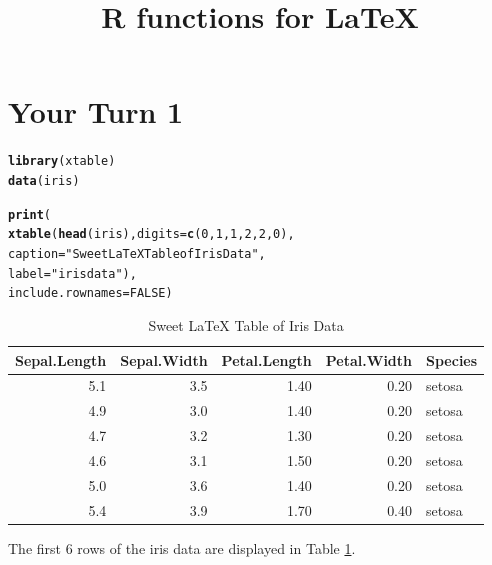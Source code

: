 \documentclass{article}\usepackage[]{graphicx}\usepackage[]{color}
\title{R functions for LaTeX}
\date{}
\makeatletter
\newcommand{\hlnum}[1]{\textcolor[rgb]{0.686,0.059,0.569}{#1}}%
\newcommand{\hlstr}[1]{\textcolor[rgb]{0.192,0.494,0.8}{#1}}%
\newcommand{\hlstd}[1]{\textcolor[rgb]{0.345,0.345,0.345}{#1}}%
\newcommand{\hlkwc}[1]{\textcolor[rgb]{0.333,0.667,0.333}{#1}}%
\newcommand{\hlkwd}[1]{\textcolor[rgb]{0.737,0.353,0.396}{\textbf{#1}}}%
\newenvironment{kframe}{%
 \def\at@end@of@kframe{}%
 \ifinner\ifhmode%
  \def\at@end@of@kframe{\end{minipage}}%
  \begin{minipage}{\columnwidth}%
 \fi\fi%
 \def\FrameCommand##1{\hskip\@totalleftmargin \hskip-\fboxsep
 \colorbox{shadecolor}{##1}\hskip-\fboxsep
     \hskip-\linewidth \hskip-\@totalleftmargin \hskip\columnwidth}%
 \MakeFramed {\advance\hsize-\width
   \@totalleftmargin\z@ \linewidth\hsize
   \@setminipage}}%
 {\par\unskip\endMakeFramed%
 \at@end@of@kframe}
\makeatother
\begin{document}
\maketitle

\section{Your Turn 1}
\begin{kframe}
\begin{alltt}
\hlkwd{library}\hlstd{(xtable)}
\hlkwd{data}\hlstd{(iris)}

\hlkwd{print}\hlstd{(}
  \hlkwd{xtable}\hlstd{(}\hlkwd{head}\hlstd{(iris),} \hlkwc{digits}\hlstd{=}\hlkwd{c}\hlstd{(}\hlnum{0}\hlstd{,} \hlnum{1}\hlstd{,} \hlnum{1}\hlstd{,} \hlnum{2}\hlstd{,} \hlnum{2}\hlstd{,} \hlnum{0}\hlstd{),}
         \hlkwc{caption}\hlstd{=}\hlstr{"Sweet LaTeX Table of Iris Data"}\hlstd{,}
         \hlkwc{label}\hlstd{=}\hlstr{"irisdata"}\hlstd{),}
  \hlkwc{include.rownames}\hlstd{=}\hlnum{FALSE}\hlstd{)}
\end{alltt}
\end{kframe}%
\begin{table}[ht]
\centering
\begin{tabular}{rrrrl}
  \hline
Sepal.Length & Sepal.Width & Petal.Length & Petal.Width & Species \\ 
  \hline
5.1 & 3.5 & 1.40 & 0.20 & setosa \\ 
  4.9 & 3.0 & 1.40 & 0.20 & setosa \\ 
  4.7 & 3.2 & 1.30 & 0.20 & setosa \\ 
  4.6 & 3.1 & 1.50 & 0.20 & setosa \\ 
  5.0 & 3.6 & 1.40 & 0.20 & setosa \\ 
  5.4 & 3.9 & 1.70 & 0.40 & setosa \\ 
   \hline
\end{tabular}
\caption{Sweet LaTeX Table of Iris Data} 
\label{irisdata}
\end{table}


The first 6 rows of the iris data are displayed in Table \ref{irisdata}. 
\end{document}
